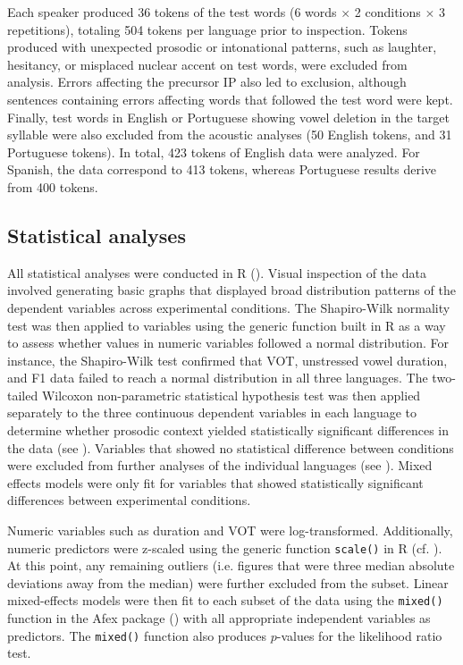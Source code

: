 \documentclass[output=paper]{langscibook}
\begin{document}
Each speaker produced 36 tokens of the test words (6 words $\times$ 2 conditions $\times$ 3 repetitions), totaling 504 tokens per language prior to inspection. Tokens produced with unexpected prosodic or intonational patterns, such as laughter, hesitancy, or misplaced nuclear accent on test words, were excluded from analysis. Errors affecting the precursor IP also led to exclusion, although sentences containing errors affecting words that followed the test word were kept. Finally, test words in English or Portuguese showing vowel deletion in the target syllable were also excluded from the acoustic analyses (50 English tokens, and 31 Portuguese tokens). In total, 423 tokens of English data were analyzed. For Spanish, the data correspond to 413 tokens, whereas Portuguese results derive from 400 tokens. 

\subsection{Statistical analyses}
All statistical analyses were conducted in R (\citealt{r_development_core_team_r:_2018}). Visual inspection of the data involved generating basic graphs that displayed broad distribution patterns of the dependent variables across experimental conditions. The Shapiro-Wilk normality test was then applied to variables using the generic function built in R as a way to assess whether values in numeric variables followed a normal distribution. For instance, the Shapiro-Wilk test confirmed that VOT, unstressed vowel duration, and F1 data failed to reach a normal distribution in all three languages. The two-tailed Wilcoxon non-parametric statistical hypothesis test was then applied separately to the three continuous dependent variables in each language to determine whether prosodic context yielded statistically significant differences in the data (see ). Variables that showed no statistical difference between conditions were excluded from further analyses of the individual languages (see ). Mixed effects models were only fit for variables that showed statistically significant differences between experimental conditions.

Numeric variables such as duration and VOT were log-transformed. Additionally, numeric predictors were z-scaled using the generic function \texttt{scale()} in R (cf. \citealt{g13, bbggj09}). At this point, any remaining outliers (i.e. figures that were three median absolute deviations away from the median) were further excluded from the subset. Linear mixed-effects models were then fit to each subset of the data using the \texttt{mixed()} function in the Afex package (\citealt{sbwabs15}) with all appropriate independent variables as predictors. The \texttt{mixed()} function also produces $p$-values for the likelihood ratio test. 
\end{document}
